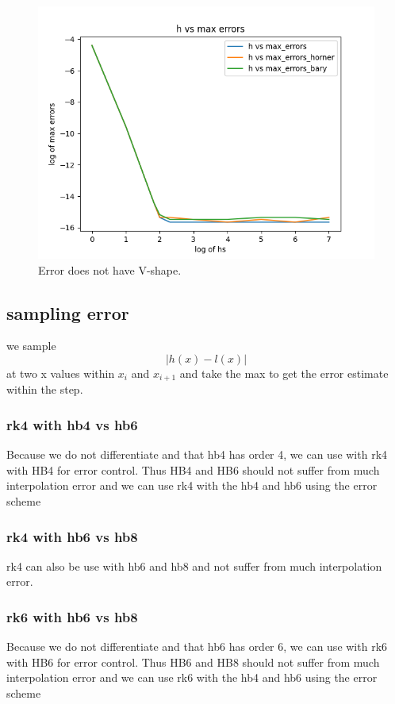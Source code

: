 \begin{figure}[H]
\centering
\includegraphics[width=0.7\linewidth]{./figures/further_work_error_is_not_v_shape_hb6}
\caption{Error does not have V-shape.}
\label{fig:error_is_not_v_shape}
\end{figure}

\subsection{sampling error}
we sample
\begin{equation}
| h(x) - l(x) |
\end{equation}
at two x values within $x_i$ and $x_{i+1}$ and take the max to get the error estimate within the step.

\subsubsection{rk4 with hb4 vs hb6}
Because we do not differentiate and that hb4 has order 4, we can use with rk4 with HB4 for error control. Thus HB4 and HB6 should not suffer from much interpolation error and we can use rk4 with the hb4 and hb6 using the error scheme

\subsubsection{rk4 with hb6 vs hb8}
rk4 can also be use with hb6  and hb8 and not suffer from much interpolation error.

\subsubsection{rk6 with hb6 vs hb8}
Because we do not differentiate and that hb6 has order 6, we can use with rk6 with HB6 for error control. Thus HB6 and HB8 should not suffer from much interpolation error and we can use rk6 with the hb4 and hb6 using the error scheme

